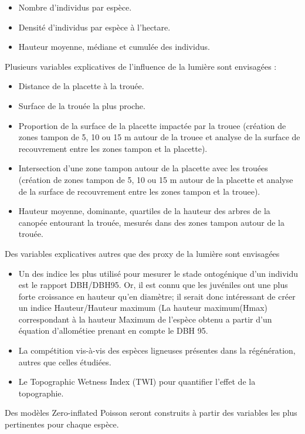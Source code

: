 \documentclass[
  12pt,
  american,
  a4paper,
  extrafontsizes,onecolumn,openright
  ]{memoir}
\newlength{\rf}
\begin{document}
\begin{itemize}
\item
  Nombre d'individus par espèce.
\item
  Densité d'individus par espèce à l'hectare.
\item
  Hauteur moyenne, médiane et cumulée des individus.
\end{itemize}

Plusieurs variables explicatives de l'influence de la lumière sont envisagées :

\begin{itemize}
\item
  Distance de la placette à la trouée.
\item
  Surface de la trouée la plus proche.
\item
  Proportion de la surface de la placette impactée par la trouee (création de zones tampon de 5, 10 ou 15 m autour de la trouee et analyse de la surface de recouvrement entre les zones tampon et la placette).
\item
  Intersection d'une zone tampon autour de la placette avec les trouées (création de zones tampon de 5, 10 ou 15 m autour de la placette et analyse de la surface de recouvrement entre les zones tampon et la trouee).
\item
  Hauteur moyenne, dominante, quartiles de la hauteur des arbres de la canopée entourant la trouée, mesurés dans des zones tampon autour de la trouée.
\end{itemize}

Des variables explicatives autres que des proxy de la lumière sont envisagées

\begin{itemize}
\item
  Un des indice les plus utilisé pour mesurer le stade ontogénique d'un individu est le rapport DBH/DBH95. Or, il est connu que les juvéniles ont une plus forte croissance en hauteur qu'en diamètre; il serait donc intéressant de créer un indice Hauteur/Hauteur maximum (La hauteur maximum(Hmax) correspondant à la hauteur Maximum de l'espèce obtenu a partir d'un équation d'allométiee prenant en compte le DBH 95.
\item
  La compétition vis-à-vis des espèces ligneuses présentes dans la régénération, autres que celles étudiées.
\item
  Le Topographic Wetness Index (TWI) pour quantifier l'effet de la topographie.
\end{itemize}

Des modèles Zero-inflated Poisson seront construits à partir des variables les plus pertinentes pour chaque espèce.
\end{document}
